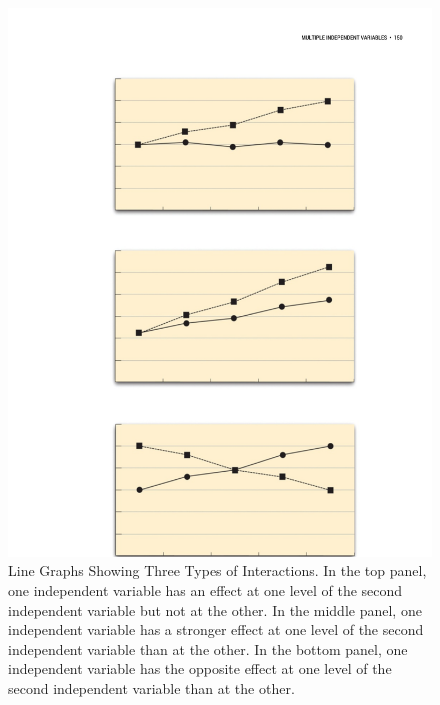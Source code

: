 \begin{figure}[0in]

\includegraphics[width=\linewidth]{figures/C8interactionlines.pdf}

\caption{Line Graphs Showing Three Types of Interactions. In the top panel, one independent variable has an effect at one level of the second independent variable but not at the other. In the middle panel, one independent variable has a stronger effect at one level of the second independent variable than at the other. In the bottom panel, one independent variable has the opposite effect at one level of the second independent variable than at the other.}

\label{fig:interactionlines}

\end{figure}

